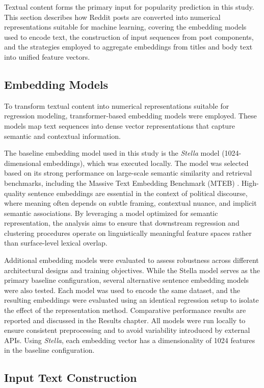 Textual content forms the primary input for popularity prediction in this study. This section describes how Reddit posts are converted into numerical representations suitable for machine learning, covering the embedding models used to encode text, the construction of input sequences from post components, and the strategies employed to aggregate embeddings from titles and body text into unified feature vectors.

\subsection{Embedding Models}

To transform textual content into numerical representations suitable for regression modeling, transformer-based embedding models were employed. These models map text sequences into dense vector representations that capture semantic and contextual information.

The baseline embedding model used in this study is the \textit{Stella} model (1024-dimensional embeddings), which was executed locally. The model was selected based on its strong performance on large-scale semantic similarity and retrieval benchmarks, including the Massive Text Embedding Benchmark (MTEB) \cite{muennighoff2022mteb}. High-quality sentence embeddings are essential in the context of political discourse, where meaning often depends on subtle framing, contextual nuance, and implicit semantic associations. By leveraging a model optimized for semantic representation, the analysis aims to ensure that downstream regression and clustering procedures operate on linguistically meaningful feature spaces rather than surface-level lexical overlap.

Additional embedding models were evaluated to assess robustness across different architectural designs and training objectives. While the Stella model serves as the primary baseline configuration, several alternative sentence embedding models were also tested. Each model was used to encode the same dataset, and the resulting embeddings were evaluated using an identical regression setup to isolate the effect of the representation method. Comparative performance results are reported and discussed in the Results chapter. All models were run locally to ensure consistent preprocessing and to avoid variability introduced by external APIs. Using \textit{Stella}, each embedding vector has a dimensionality of 1024 features in the baseline configuration.

\subsection{Input Text Construction}

